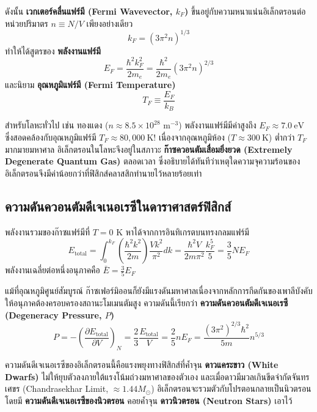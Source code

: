 ดังนั้น \textbf{เวกเตอร์คลื่นแฟร์มี (Fermi Wavevector, $k_F$)} ขึ้นอยู่กับความหนาแน่นอิเล็กตรอนต่อหน่วยปริมาตร $n \equiv N/V$ เพียงอย่างเดียว
\begin{equation}
k_F = (3\pi^2 n)^{1/3}
\label{eq:fermi_wavevector}
\end{equation}
ทำให้ได้สูตรของ \textbf{พลังงานแฟร์มี}
\begin{equation}
E_F = \frac{\hbar^2 k_F^2}{2m_e} = \frac{\hbar^2}{2m_e} (3\pi^2 n)^{2/3}
\label{eq:fermi_energy_formula}
\end{equation}
และนิยาม \textbf{อุณหภูมิแฟร์มี (Fermi Temperature)}
\begin{equation}
T_F \equiv \frac{E_F}{k_B}
\end{equation}

สำหรับโลหะทั่วไป เช่น ทองแดง ($n \approx 8.5 \times 10^{28}\text{ m}^{-3}$) พลังงานแฟร์มีมีค่าสูงถึง $E_F \approx 7.0~\text{eV}$ ซึ่งสอดคล้องกับอุณหภูมิแฟร์มี $T_F \approx 80,000~\text{K}$! เนื่องจากอุณหภูมิห้อง ($T \approx 300~\text{K}$) ต่ำกว่า $T_F$ มากมายมหาศาล อิเล็กตรอนในโลหะจึงอยู่ในสภาวะ \textbf{ก๊าซควอนตัมเสื่อมยิ่งยวด (Extremely Degenerate Quantum Gas)} ตลอดเวลา ซึ่งอธิบายได้ทันทีว่าเหตุใดความจุความร้อนของอิเล็กตรอนจึงมีค่าน้อยกว่าที่ฟิสิกส์คลาสสิกทำนายไว้หลายร้อยเท่า

\subsection{ความดันควอนตัมดีเจเนอเรซีในดาราศาสตร์ฟิสิกส์}
พลังงานรวมของก๊าซแฟร์มีที่ $T = 0\text{ K}$ หาได้จากการอินทิเกรตบนทรงกลมแฟร์มี
\begin{equation}
E_{\text{total}} = \int_0^{k_F} \left(\frac{\hbar^2 k^2}{2m}\right) \frac{V k^2}{\pi^2} dk = \frac{\hbar^2 V}{2m\pi^2} \frac{k_F^5}{5} = \frac{3}{5} N E_F
\label{eq:fermi_total_energy}
\end{equation}
พลังงานเฉลี่ยต่อหนึ่งอนุภาคคือ $\bar{E} = \frac{3}{5} E_F$

แม้ที่อุณหภูมิศูนย์สัมบูรณ์ ก๊าซเฟอร์มิออนก็ยังมีแรงดันมหาศาลเนื่องจากหลักการกีดกันของเพาลีบังคับให้อนุภาคต้องครอบครองสถานะโมเมนตัมสูง ความดันนี้เรียกว่า \textbf{ความดันควอนตัมดีเจเนอเรซี (Degeneracy Pressure, $P$)}
\begin{equation}
P = -\left( \frac{\partial E_{\text{total}}}{\partial V} \right)_N = \frac{2}{3} \frac{E_{\text{total}}}{V} = \frac{2}{5} n E_F = \frac{(3\pi^2)^{2/3}\hbar^2}{5m} n^{5/3}
\label{eq:degeneracy_pressure}
\end{equation}

ความดันดีเจเนอเรซีของอิเล็กตรอนนี้คือแรงพยุงทางฟิสิกส์ที่ค้ำจุน \textbf{ดาวแคระขาว (White Dwarfs)} ไม่ให้ยุบตัวลงภายใต้แรงโน้มถ่วงมหาศาลของตัวเอง และเมื่อดาวมีมวลเกินขีดจำกัดจันทรเศขร (Chandrasekhar Limit, $\approx 1.44 M_\odot$) อิเล็กตรอนจะรวมตัวกับโปรตอนกลายเป็นนิวตรอน โดยมี \textbf{ความดันดีเจเนอเรซีของนิวตรอน} คอยค้ำจุน \textbf{ดาวนิวตรอน (Neutron Stars)} เอาไว้

